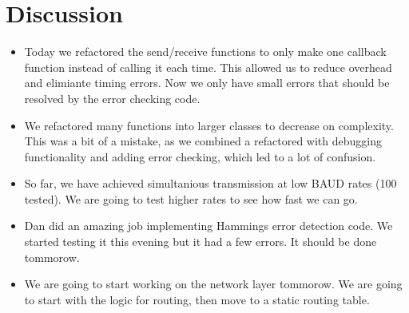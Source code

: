 \documentclass{article}
\begin{document}
\section*{Discussion}
\begin{itemize}
    \item Today we refactored the send/receive functions to only make one callback function instead of calling it each time.
    This allowed us to reduce overhead and elimiante timing errors. Now we only have small errors that should be resolved by 
    the error checking code. 
    \item We refactored many functions into larger classes to decrease on complexity. This was a bit of a mistake, as we combined a refactored
    with debugging functionality and adding error checking, which led to a lot of confusion.
    \item So far, we have achieved simultanious transmission at low BAUD rates (100 tested). We are going to test higher rates to see how fast we can go.
    \item Dan did an amazing job implementing Hammings error detection code. We started testing it this evening but it had a few errors. It should be done tommorow.
    \item We are going to start working on the network layer tommorow. We are going to start with the logic for routing, then move to a static routing table.
\end{itemize}

\end{document}

